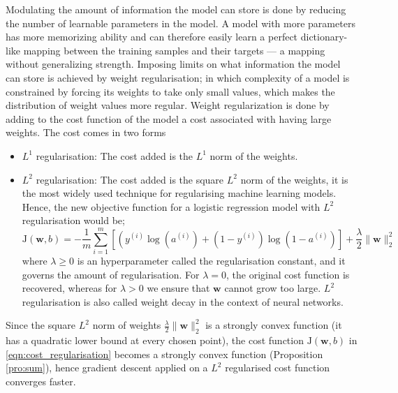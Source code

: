 \documentclass[12pt]{report}
\numberwithin{equation}{section}
\begin{document}
Modulating the amount of information the model can store is done by reducing  the number of learnable parameters in the model. A model with more parameters has more memorizing ability and can therefore easily learn a perfect dictionary-like mapping between the training samples and their targets — a mapping without generalizing strength. Imposing limits on what information the model can store is achieved by {weight regularisation}; in which complexity of a model is constrained by forcing its weights to take only small values, which makes the distribution of weight values more {regular}. Weight regularization is done by adding to the cost function of the model a cost associated with having large weights. The cost comes in two forms
\begin{itemize}
\item $L^1$ regularisation: The cost added is the $L^1$ norm of the weights.
\item $L^2$ regularisation: The cost added is the square $L^2$ norm of the weights, it is the most widely used technique for regularising machine learning models. Hence, the new objective function for a logistic regression model with $L^2$ regularisation would be;
\begin{equation}\label{eqn:cost_regularisation}
\mathrm{J}(\bm{w}, b) =-\frac{1}{m} \sum_{i=1}^{m}\left[\left(y^{(i)} \log \left(a^{(i)}\right)+\left(1-y^{(i)}\right) \log \left(1-a^{(i)}\right)\right]\right. + \frac{\lambda}{2}\|\bm{w}\|_2^2
\end{equation}
where $\lambda\geq 0$ is an hyperparameter called the {regularisation constant}, and it governs the amount of regularisation. For $\lambda = 0$, the  original cost function is recovered, whereas for $\lambda > 0$ we ensure that $\bm{w}$ cannot grow too large. $L^2$ regularisation is also called weight decay in the context of neural networks. 
\end{itemize}
Since the square $L^2$ norm of weights $\frac{\lambda}{2}\|\bm{w}\|_2^2$ is a strongly convex function (it has a quadratic lower bound at every chosen point), the cost function $\mathrm{J}(\bm{w}, b)$ in \eqref{eqn:cost_regularisation} becomes a strongly convex function (Proposition \ref{pro:sum}), hence gradient descent applied on a $L^2$ regularised cost function converges faster.
\end{document}
